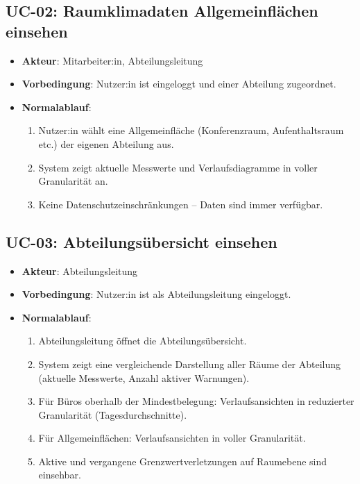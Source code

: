 \documentclass[12pt,a4paper]{article}
\begin{document}
\subsection{UC-02: Raumklimadaten Allgemeinflächen einsehen}
\begin{itemize}
	\item \textbf{Akteur}: Mitarbeiter:in, Abteilungsleitung
	\item \textbf{Vorbedingung}: Nutzer:in ist eingeloggt und einer Abteilung zugeordnet.
	\item \textbf{Normalablauf}:
	\begin{enumerate}
		\item Nutzer:in wählt eine Allgemeinfläche (Konferenzraum, Aufenthaltsraum etc.) der eigenen Abteilung aus.
		\item System zeigt aktuelle Messwerte und Verlaufsdiagramme in voller Granularität an.
		\item Keine Datenschutzeinschränkungen -- Daten sind immer verfügbar.
	\end{enumerate}
\end{itemize}

\subsection{UC-03: Abteilungsübersicht einsehen}
\begin{itemize}
	\item \textbf{Akteur}: Abteilungsleitung
	\item \textbf{Vorbedingung}: Nutzer:in ist als Abteilungsleitung eingeloggt.
	\item \textbf{Normalablauf}:
	\begin{enumerate}
		\item Abteilungsleitung öffnet die Abteilungsübersicht.
		\item System zeigt eine vergleichende Darstellung aller Räume der Abteilung (aktuelle Messwerte, Anzahl aktiver Warnungen).
		\item Für Büros oberhalb der Mindestbelegung: Verlaufsansichten in reduzierter Granularität (Tagesdurchschnitte).
		\item Für Allgemeinflächen: Verlaufsansichten in voller Granularität.
		\item Aktive und vergangene Grenzwertverletzungen auf Raumebene sind einsehbar.
	\end{enumerate}
\end{itemize}
\end{document}
